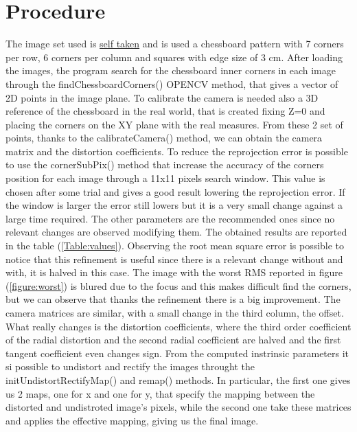 \documentclass[11pt,a4paper]{article}
\newcommand{\cc}{\fontfamily{txtt}\selectfont}
\begin{document}
\section{Procedure}
The image set used is  \href{https://drive.google.com/file/d/1pfgG-me5uAq6LSIfivCutbsjdKhKwFRb/view?usp=sharing}{self taken} and is used a chessboard pattern with 7 corners per row, 6 corners per column and squares with edge size of 3 cm.
After loading the images, the program search for the chessboard inner corners in each image through the {\cc findChessboardCorners()} OPENCV method, that gives a vector of 2D points in the image plane.
To calibrate the camera is needed also a 3D reference of the chessboard in the real world, that is created fixing Z=0 and placing the corners on the XY plane with the real measures.
From these 2 set of points, thanks to the {\cc calibrateCamera()} method, we can obtain the camera matrix and the distortion coefficients. 
To reduce the reprojection error is possible to use the {\cc cornerSubPix()} method that increase the accuracy of the corners position for each image through a 11x11 pixels search window. 
This value is chosen after some trial and gives a good result lowering the reprojection error.
If the window is larger the error still lowers but it is a very small change against a large time required.
The other parameters are the recommended ones since no relevant changes are observed modifying them.\newline
The obtained results are reported in the table (\ref{Table:values}). 
Observing the root mean square error is possible to notice that this refinement is useful since there is a relevant change without and with, it is halved in this case.
The image with the worst RMS reported in figure (\ref{figure:worst}) is blured due to the focus and this makes difficult find the corners, but we can observe that thanks the refinement there is a big improvement.
The camera matrices are similar, with a small change in the third column, the offset.
What really changes is the distortion coefficients, where the third order coefficient of the radial distortion and the second radial coefficient are halved and the first tangent coefficient even changes sign.\newline
From the computed instrinsic parameters it si possible to undistort and rectify the images throught the {\cc initUndistortRectifyMap()} and {\cc remap()} methods.
In particular, the first one gives us 2 maps, one for x and one for y, that specify the mapping between the distorted and undistroted image's pixels, while the second one take these matrices and applies the effective mapping, giving us the final image.
\end{document}
